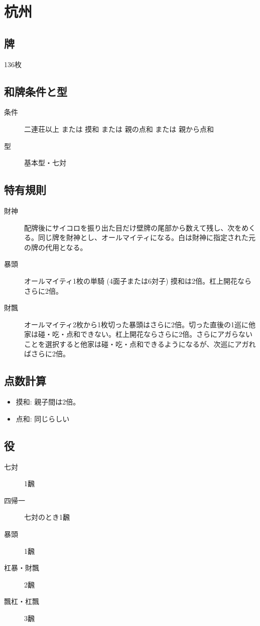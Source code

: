 \documentclass{ltjsarticle}
\begin{document}
\section{杭州}
\subsection{牌}136枚
\subsection{和牌条件と型}
\begin{description}
    \item[条件] 二連荘以上 または 摸和 または 親の点和 または 親から点和
    \item[型] 基本型・七対
\end{description}
\subsection{特有規則}
\begin{description}
    \item[財神] 配牌後にサイコロを振り出た目だけ壁牌の尾部から数えて残し、次をめくる。同じ牌を財神とし、オールマイティになる。白は財神に指定された元の牌の代用となる。
    \item[暴頭] オールマイティ1枚の単騎 (4面子または6対子) 摸和は2倍。杠上開花ならさらに2倍。
    \item[財飄] オールマイティ2枚から1枚切った暴頭はさらに2倍。切った直後の1巡に他家は碰・吃・点和できない。杠上開花ならさらに2倍。さらにアガらないことを選択すると他家は碰・吃・点和できるようになるが、次巡にアガればさらに2倍。
\end{description}
\subsection{点数計算}
\begin{itemize}
    \item 摸和: 親子間は2倍。
    \item 点和: 同じらしい
\end{itemize}
\subsection{役}
\begin{description}
    \item[七対] 1飜
    \item[四帰一] 七対のとき1飜
    \item[暴頭] 1飜
    \item[杠暴・財飄] 2飜
    \item[飄杠・杠飄] 3飜
\end{description}
\end{document}
